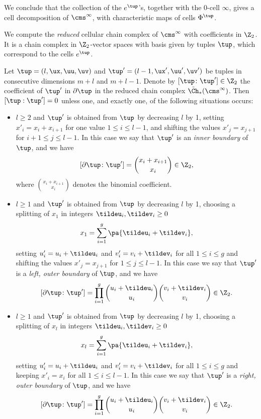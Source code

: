 We conclude that the collection of the $e^{\tup}$'s, together with the $0$-cell $\infty$,
gives a cell decomposition of $\cms^{\infty}$, with characteristic maps of cells $\Phi^{\tup}$.

We compute the \emph{reduced} cellular chain complex of $\cms^{\infty}$
with coefficients in $\Z_2$. It is a chain complex in $\Z_2$-vector spaces with basis given
by tuples $\tup$, which correspond to the cells $e^{\tup}$.
\begin{lem}
\label{lem:doperatoropenmodtwo}
Let $\tup=(l,\ux,\uu, \uv)$ and
$\tup'=(l-1,\ux',\uu',\uv')$
be tuples in consecutive dimensions $m+l$ and $m+l-1$. Denote by $[\tup\colon\tup']\in\Z_2$ the coefficient
of $\tup'$ in $\partial \tup$ in the reduced chain complex $\tilde\Ch_*(\cms^{\infty})$.
Then $[\tup:\tup']=0$ unless one, and exactly one, of the following situations occurs:
\begin{itemize}
 \item $l\geq 2$ and $\tup'$ is obtained from $\tup$ by decreasing $l$ by 1, setting $x'_i=x_i+x_{i+1}$
 for one value $1\leq i\leq l-1$, and shifting the values
 $x'_j=x_{j+1}$ for $i+1\leq j\leq l-1$. In this case we say that $\tup'$ is an \emph{inner boundary} of $\tup$, and
 we have
 \[
  [\partial \tup\colon\tup']=\binom{x_i+x_{i+1}}{x_i}\in\Z_2,
 \]
 where $\binom{x_i+x_{i+1}}{x_i}$ denotes the binomial coefficient.
 \item $l\geq 1$ and $\tup'$ is obtained from $\tup$ by decreasing $l$ by 1, choosing a splitting of $x_1$
 in integers $\tildeu_i,\tildev_i\geq 0$
 \[
  x_1=\sum_{i=1}^g \pa{\tildeu_i+\tildev_i},
 \]
 setting $u'_i=u_i+\tildeu_i$ and $v'_i=v_i+\tildev_i$ for all $1\leq i\leq g$ and shifting the values
 $x'_j=x_{j+1}$ for $1\leq j\leq l-1$. In this case we say that $\tup'$ is a \emph{left, outer boundary} of $\tup$, and we have
 \[
  [\partial \tup\colon\tup']=\prod_{i=1}^g\binom{u_i+\tildeu_i}{u_i}\binom{v_i+\tildev_i}{v_i}\in\Z_2.
 \]
 \item $l\geq 1$ and $\tup'$ is obtained from $\tup$ by decreasing $l$ by 1, choosing a splitting of $x_l$
 in integers $\tildeu_i,\tildev_i\geq 0$
 \[
  x_l=\sum_{i=1}^g \pa{\tildeu_i+\tildev_i},
 \]
 setting $u'_i=u_i+\tildeu_i$ and $v'_i=v_i+\tildev_i$ for all $1\leq i\leq g$ and keeping $x'_i=x_i$ for all $1\leq i\leq l-1$.
 In this case we say that $\tup'$ is a \emph{right, outer boundary} of $\tup$, and we have
 \[
  [\partial \tup\colon\tup']=\prod_{i=1}^g\binom{u_i+\tildeu_i}{u_i}\binom{v_i+\tildev_i}{v_i}\in\Z_2.
 \]
\end{itemize}

\end{lem}
